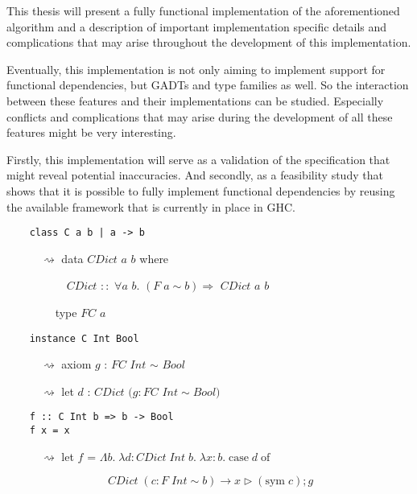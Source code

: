 This thesis will present a fully functional implementation of the aforementioned
algorithm and a description of important implementation specific details and
complications that may arise throughout the development of this implementation.

Eventually, this implementation is not only aiming to implement support for functional dependencies,
but GADTs and type families as well. So the interaction between these features
and their implementations can be studied. Especially conflicts and complications
that may arise during the development of all these features might be very
interesting.

Firstly, this implementation will serve as a validation of the specification
that might reveal potential inaccuracies. And secondly, as a feasibility study
that shows that it is possible to fully implement functional dependencies by
reusing the available framework that is currently in place in GHC.

\begin{verbatim}
    class C a b | a -> b
\end{verbatim}
$\quad\quad\quad\rightsquigarrow$ data $CDict$ $a$ $b$ where

$\quad\quad\quad\quad\quad$ $CDict$ $::$ $\forall a$ $b$. $(F \; a \sim b)
\Rightarrow$ $CDict$ $a$ $b$

$\quad\quad\quad\quad$ type $FC$ $a$

\begin{verbatim}
    instance C Int Bool
\end{verbatim}
$\quad\quad\quad\rightsquigarrow$ axiom $g$ : $FC$ $Int$ $\sim$ $Bool$

$\quad\quad\quad\rightsquigarrow$ let $d$ : $CDict$ $(g : FC$ $Int \sim Bool)$

\begin{verbatim}
    f :: C Int b => b -> Bool
    f x = x
\end{verbatim}
$\quad\quad\quad\rightsquigarrow$ let $f$ =
$\Lambda b. \; \lambda d : CDict \; Int \; b. \;\lambda x : b. \; \text{case} \; d
\; \text{of}$

$\quad\quad\quad\quad\quad\quad\quad\quad\quad %
CDict \; (c : F \; Int \sim b ) \rightarrow x \triangleright (\text{sym} \; c) ; g$



